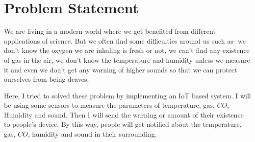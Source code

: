 \chapter{Problem Statement}
We are living in a modern world where we get benefited from different applications of science. But we often find some difficulties around us such as- we don't know the oxygen we are inhaling is fresh or not, we can't find any existence of gas in the air, we don't know the temperature and humidity unless we measure it and even we don't get any warning of higher sounds so that we can protect ourselves from being deaves.

Here, I tried to solved these problem by implementing an IoT based system. I will be using some sensors to measure the parameters of temperature, gas, $CO$, Humidity and sound. Then I will send the warning or amount of their existence to people's device. By this way, people will get notified about the temperature, gas, $CO$, humidity and sound in their surrounding.
